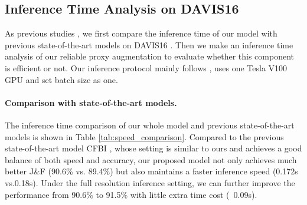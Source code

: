 \documentclass[letterpaper]{article} \usepackage{aaai22}  \usepackage{times}  \usepackage{helvet}  \usepackage{courier}  \usepackage[hyphens]{url}  \usepackage{graphicx} \urlstyle{rm} \def\UrlFont{\rm}  \usepackage{natbib}  \usepackage{caption} \DeclareCaptionStyle{ruled}{labelfont=normalfont,labelsep=colon,strut=off} \frenchspacing  \setlength{\pdfpagewidth}{8.5in}  \setlength{\pdfpageheight}{11in}  \usepackage{algorithm}
\begin{document}
\subsection{Inference Time Analysis on DAVIS16}
As previous studies \cite{yang2020collaborative,oh2019video,xie2021efficient,oh2019video}, we first compare the inference time of our model with previous state-of-the-art models on DAVIS16 \cite{perazzi2016benchmark}. Then we make an inference time analysis of our reliable proxy augmentation to evaluate whether this component is efficient or not. Our inference protocol mainly follows \cite{yang2020collaborative}, uses one Tesla V100 GPU and set batch size as one. 

\paragraph{Comparison with state-of-the-art models.}
The inference time comparison of our whole model and previous state-of-the-art models is shown in Table \ref{tab:speed_comparison}. Compared to the previous state-of-the-art model CFBI \cite{yang2020collaborative}, whose setting is similar to ours and achieves a good balance of both speed and accuracy, our proposed model not only achieves much better J\&F (90.6\% vs. 89.4\%) but also maintains a faster inference speed (0.172s vs.0.18s). Under the full resolution inference setting, we can further improve the performance from 90.6\% to 91.5\% with little extra time cost (~0.09s). 
\end{document}
